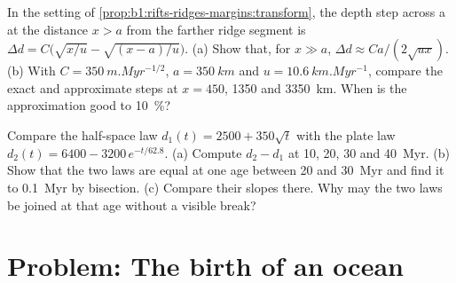 \begin{exercise}[$\star\star\star$]\label{exo:b1:rifts-ridges-margins:11}
In the setting of \cref{prop:b1:rifts-ridges-margins:transform}, the depth step
across a  at the distance $x > a$ from the farther ridge segment
is $\Delta d = C\bigl(\sqrt{x/u} - \sqrt{(x - a)/u}\bigr)$. (a) Show that, for
$x \gg a$, $\Delta d \approx Ca/(2\sqrt{ux})$. (b) With
$C = \qty{350}{m.Myr^{-1/2}}$, $a = \qty{350}{km}$ and
$u = \qty{10.6}{km.Myr^{-1}}$, compare the exact and approximate steps at
$x = 450$, 1350 and \qty{3350}{km}. When is the approximation good to
\qty{10}{\percent}?
\end{exercise}

\begin{exercise}[$\star\star\star$]\label{exo:b1:rifts-ridges-margins:12}
Compare the half-space law $d_1(t) = 2500 + 350\sqrt t$ with the plate law
$d_2(t) = 6400 - 3200\,e^{-t/62.8}$. (a) Compute $d_2 - d_1$ at 10, 20, 30 and
\qty{40}{Myr}. (b) Show that the two laws are equal at one age between 20 and
\qty{30}{Myr} and find it to \qty{0.1}{Myr} by bisection. (c) Compare their
slopes there. Why may the two laws be joined at that age without a visible
break?
\end{exercise}

\section{Problem: The birth of an ocean}

